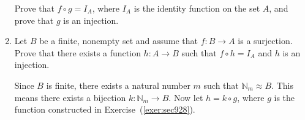 \begin{enumerate}

Prove that $f \circ g = I_A$, where $I_A$ is the identity function on the set $A$, and prove that $g$ is an injection.

\item Let $B$ be a finite, nonempty set and assume that $f:B \to A$ is a surjection.  Prove that there exists a function $h:A \to B$ such that $f \circ h = I_A$ and $h$ is an injection.

\hint  Since $B$ is finite, there exists a natural number $m$ such that $\mathbb{N}_m \approx B$.  This means there exists a bijection $k:\mathbb{N}_m \to B$.  Now let $h = k \circ g$, where $g$ is the function constructed in Exercise~(\ref{exer:sec928}).

\end{enumerate}



